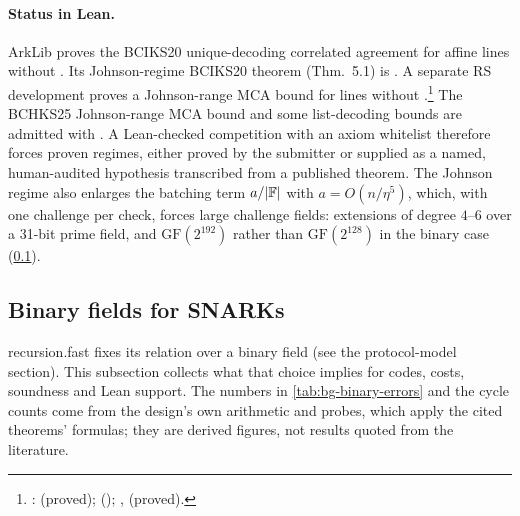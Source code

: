 \paragraph{Status in Lean.} ArkLib proves the BCIKS20 unique-decoding correlated agreement for
affine lines without . Its Johnson-regime BCIKS20 theorem (Thm.~5.1) is .
A separate RS development proves a Johnson-range MCA bound for lines without
.\footnote{:  (proved);
 (); ,
 (proved).} The BCHKS25 Johnson-range MCA
bound and some list-decoding bounds are admitted with . A Lean-checked competition
with an axiom whitelist therefore forces proven regimes, either proved by the submitter or
supplied as a named, human-audited hypothesis transcribed from a published theorem. The Johnson
regime also enlarges the batching term $a/|\mathbb{F}|$ with $a=O(n/\eta^5)$, which, with one challenge
per check, forces large challenge fields: extensions of degree $4$--$6$ over a 31-bit prime field,
and $\mathrm{GF}(2^{192})$ rather than $\mathrm{GF}(2^{128})$ in the binary case
(\cref{subsec:bg-binary}).

\subsection{Binary fields for SNARKs}\label{subsec:bg-binary}

recursion.fast fixes its relation over a binary field (see the protocol-model section). This
subsection collects what that choice implies for codes, costs, soundness and Lean support. The
numbers in \cref{tab:bg-binary-errors} and the cycle counts come from the design's own arithmetic
and probes, which apply the cited theorems' formulas; they are derived figures, not results
quoted from the literature.

